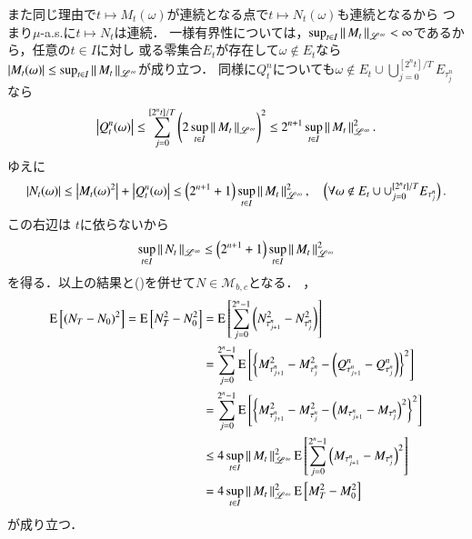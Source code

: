 \begin{prf}
{			また同じ理由で$t \longmapsto M_t(\omega)$が連続となる点で$t \longmapsto N_t(\omega)$も連続となるから
			つまり$\mu$-a.s.に$t \longmapsto N_t$は連続．
			一様有界性については，$\operatorname*{sup}_{t \in I} \left\|\, M_t\, \right\|_{\mathscr{L}^\infty} < \infty$であるから，任意の$t \in I$に対し
			或る零集合$E_t$が存在して$\omega \notin E_t$なら$|M_t(\omega)| \leq \operatorname*{sup}_{t \in I} \left\|\, M_t\, \right\|_{\mathscr{L}^\infty}$が成り立つ．
			同様に$Q_t^n$についても$\omega \notin E_t \cup \bigcup_{j=0}^{[2^nt]/T}E_{\tau_j^n}$なら
			\begin{align}
				\left| Q_t^n(\omega) \right| \leq \sum_{j=0}^{[2^nt]/T} \left( 2\operatorname*{sup}_{t \in I} \left\|\, M_t\, \right\|_{\mathscr{L}^\infty} \right)^2 \leq 2^{n+1} \operatorname*{sup}_{t \in I} \left\|\, M_t\, \right\|_{\mathscr{L}^\infty}^2.
			\end{align}
			ゆえに
			\begin{align}
				\left| N_t(\omega) \right| \leq \left|{M_t(\omega)}^2\right| + \left|Q_t^n(\omega)\right| \leq \left( 2^{n+1}+1 \right) \operatorname*{sup}_{t \in I} \left\|\, M_t\, \right\|_{\mathscr{L}^\infty}^2
				,\quad \left( \forall \omega \notin E_t \cup \cup_{j=0}^{[2^nt]/T}E_{\tau_j^n} \right).
			\end{align}
			この右辺は
			$t$に依らないから
			\begin{align}
				\operatorname*{sup}_{t \in I} \left\|\, N_t\, \right\|_{\mathscr{L}^\infty} \leq \left( 2^{n+1}+1 \right) \operatorname*{sup}_{t \in I} \left\|\, M_t\, \right\|_{\mathscr{L}^\infty}^2
			\end{align}
			を得る．以上の結果と()を併せて$N \in \mathcal{M}_{b,c}$となる．
		}，
		\begin{align}
			\operatorname{E} \left[ (N_T - N_0)^2 \right] = \operatorname{E} \left[ N_T^2 - N_0^2 \right] 
			&= \operatorname{E} \left[ \sum_{j=0}^{2^n-1}\left( N_{\tau_{j+1}^n}^2 - N_{\tau_j^n}^2 \right) \right] \\
			&= \sum_{j=0}^{2^n-1}\operatorname{E} \left[ \left\{ M_{\tau_{j+1}^n}^2 - M_{\tau_j^n}^2 - \left( Q_{\tau_{j+1}^n}^n - Q_{\tau_j^n}^n \right) \right\}^2 \right] \\
			&= \sum_{j=0}^{2^n-1}\operatorname{E} \left[ \left\{ M_{\tau_{j+1}^n}^2 - M_{\tau_j^n}^2 - \left( M_{\tau_{j+1}^n} - M_{\tau_j^n} \right)^2 \right\}^2 \right] \\
			&\leq 4 \operatorname*{sup}_{t \in I} \left\|\, M_t\, \right\|_{\mathscr{L}^\infty}^2 \operatorname{E} \left[ \sum_{j=0}^{2^n-1} \left( M_{\tau_{j+1}^n} - M_{\tau_j^n} \right)^2  \right] \\
			&= 4 \operatorname*{sup}_{t \in I} \left\|\, M_t\, \right\|_{\mathscr{L}^\infty}^2 \operatorname{E} \left[ M_T^2 - M_0^2 \right]
		\end{align}
		が成り立つ．
		\QED
	\end{prf}